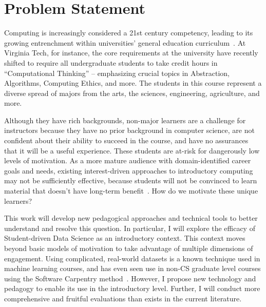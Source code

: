 \section{Problem Statement}

Computing is increasingly considered a 21st century competency, leading to its growing entrenchment within universities’ general education curriculum~\cite{wing2006}.
At Virginia Tech, for instance, the core requirements at the university have recently shifted to require all undergraduate students to take credit hours in ``Computational Thinking'' -- emphasizing crucial topics in Abstraction, Algorithms, Computing Ethics, and more.
The students in this course represent a diverse spread of majors from the arts, the sciences, engineering, agriculture, and more.

Although they have rich backgrounds, non-major learners are a challenge for instructors because they have no prior background in computer science, are not confident about their ability to succeed in the course, and have no assurances that it will be a useful experience.
These students are at-risk for dangerously low levels of motivation.
As a more mature audience with domain-identified career goals and needs, existing interest-driven approaches to introductory computing may not be sufficiently effective, because students will not be convinced to learn material that doesn't have long-term benefit~\cite{guzdial2006imagineering}.
How do we motivate these unique learners?

This work will develop new pedagogical approaches and technical tools to better understand and resolve this question.
In particular, I will explore the efficacy of Student-driven Data Science as an introductory context.
This context moves beyond basic models of motivation to take advantage of multiple dimensions of engagement.
Using complicated, real-world datasets is a known technique used in machine learning courses, and has even seen use in non-CS graduate level courses using the Software Carpentry method~\cite{Wilson-SoftwareCarpentry}.
However, I propose new technology and pedagogy to enable its use in the introductory level.
Further, I will conduct more comprehensive and fruitful evaluations than exists in the current literature.
